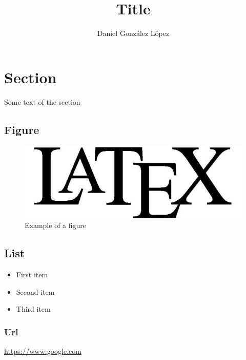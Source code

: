 \documentclass{article}
\begin{document}
\title{Title}
\author{Daniel Gonz\'alez L\'opez}

\maketitle

\section{Section}

Some text of the section

\subsection{Figure}

\begin{figure}[H]
	\centering
	\includegraphics[width=\linewidth]{figure1.png}
	\caption{Example of a figure}
	\label{fig:net1}
\end{figure}

\subsection{List}

\begin{itemize}
	\item First item
	\item Second item
	\item Third item
\end{itemize}

\subsubsection{Url}

\url{https://www.google.com}
\end{document}
